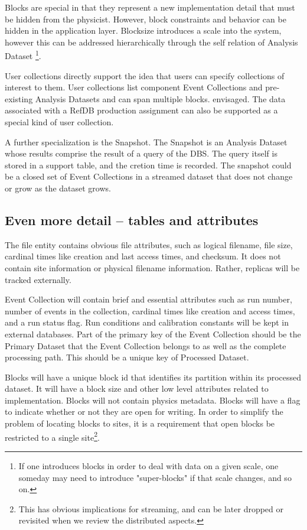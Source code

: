 \documentclass{cmspaper}
\begin{document}
Blocks are special in that they represent a new implementation detail 
that must be hidden from the physicist.  However, block constraints and 
behavior can be hidden in the application layer.  Blocksize 
introduces a scale into the system,  however this can be addressed hierarchically 
through the self relation of Analysis Dataset
\footnote{If one introduces blocks in order to deal with data on a given scale, one someday may need 
to introduce "super-blocks" if that scale changes, and so on.}. 

User collections directly support the idea that users can specify 
collections of interest to them.  User collections list component Event Collections
and pre-existing Analysis Datasets and can span multiple blocks.  
envisaged.  The data associated with a RefDB production assignment can also be supported 
as a special kind of user collection.

A further specialization is the Snapshot.  The Snapshot is an Analysis Dataset whose results 
comprise the result of a query of the DBS.  The query itself is stored in a support table, and 
the cretion time is recorded.
The snapshot could be a closed set of Event Collections in a streamed dataset that does 
not change or grow as the dataset grows.  

\subsection{Even more detail -- tables and attributes}

The file entity contains obvious 
file attributes, such as logical filename, file size, cardinal times like creation and 
last access times, and checksum.  It does not contain site information or physical filename 
information.  Rather, replicas will be tracked externally.  

Event Collection will contain brief and essential attributes such as run number, 
number of events in the collection, cardinal times like creation and access times, 
and a run status flag.  Run conditions and calibration constants will
be kept in external databases.  Part of the primary key of the Event Collection
should be the Primary Dataset that the Event Collection 
belongs to as well as the complete processing path.  This should be a unique key of 
Processed Dataset.  

Blocks will have a unique block id that identifies its partition within its processed dataset.
It will have a block size and other low level attributes related to implementation.  Blocks 
will not contain physics metadata.  
Blocks will have a flag to indicate whether or not they are open for writing. 
In order to simplify the problem of locating blocks to sites, it is a 
requirement that open blocks be restricted to a single site\footnote{This has obvious 
implications for streaming, and can be later dropped or revisited when we review the distributed 
aspects.}.
\end{document}
